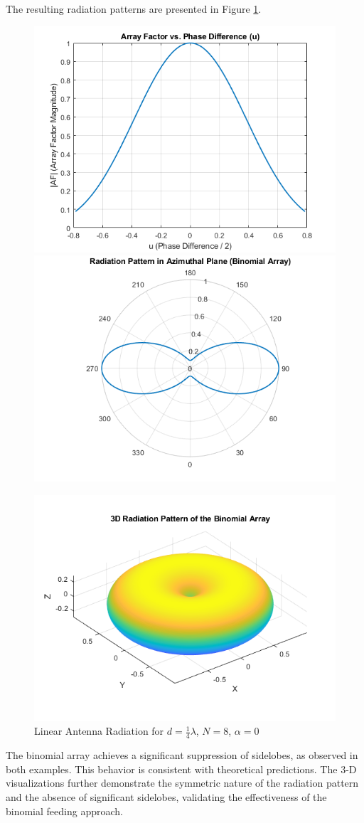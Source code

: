 \documentclass[a4paper, 12pt, english]{article}
\begin{document}
The resulting radiation patterns are presented in Figure \ref{fig:binomial 2}.
\begin{figure}[H]
    \centering
         \includegraphics[width=0.49\linewidth]{report/images/binomial_2D_2.png}
         \hfill
         \includegraphics[width=0.49\linewidth]{report/images/binomial_2D_rad_2.png}
         \hfill

         \includegraphics[width=0.49\linewidth]{report/images/binomial_3D_2.png}
         \caption{Linear Antenna Radiation for $ {d} = {\frac{1}{4}}{\lambda} $, $ {N} = {8} $, $ {\alpha} = {0} $}
         \label{fig:binomial 2}
\end{figure}

The binomial array achieves a significant suppression of sidelobes, as observed in both examples. This behavior is consistent with theoretical predictions.
\newline
\noindent
The 3-D visualizations further demonstrate the symmetric nature of the radiation pattern and the absence of significant sidelobes, validating the effectiveness of the binomial feeding approach.
\end{document}
